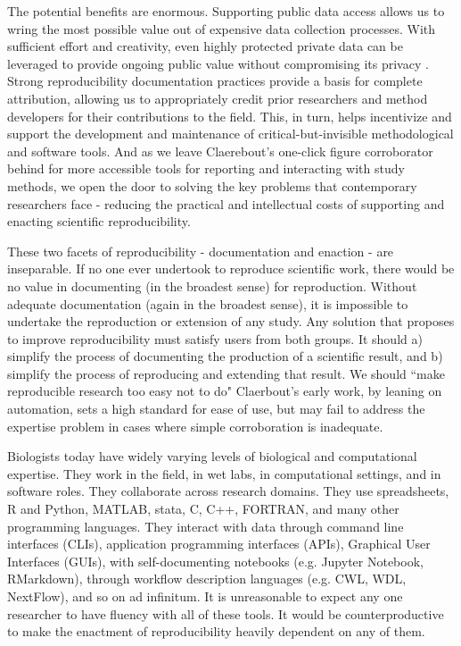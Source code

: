 The potential benefits are enormous. Supporting public data access allows us to
wring the most possible value out of expensive data collection processes. With
sufficient effort and creativity, even highly protected private data can be
leveraged to provide ongoing public value without compromising its privacy \parencite{schaffter_nlp_2022}.
Strong reproducibility documentation practices provide a basis for complete
attribution, allowing us to appropriately credit prior researchers and method
developers for their contributions to the field. This, in turn, helps
incentivize and support the development and maintenance of
critical-but-invisible methodological and software tools. And as we leave
Claerebout’s one-click figure corroborator behind for more accessible tools for
reporting and interacting with study methods, we open the door to solving the
key problems that contemporary researchers face - reducing the practical and
intellectual costs of supporting and enacting scientific reproducibility.

These two facets of reproducibility - documentation and enaction - are
inseparable. If no one ever undertook to reproduce scientific work, there would
be no value in documenting (in the broadest sense) for reproduction. Without
adequate documentation (again in the broadest sense), it is impossible to
undertake the reproduction or extension of any study. Any solution that proposes
to improve reproducibility must satisfy users from both groups. It should a)
simplify the process of documenting the production of a scientific result, and
b) simplify the process of reproducing and extending that result. We should
“make reproducible research too easy not to do" \parencite[19]{whitaker_turing_2019}
Claerbout’s early work, by leaning on automation, sets a high standard for ease
of use, but may fail to address the expertise problem in cases where simple
corroboration is inadequate.

Biologists today have widely varying levels of biological and computational
expertise. They work in the field, in wet labs, in computational settings, and
in software roles. They collaborate across research domains. They use
spreadsheets, R and Python, MATLAB, stata, C, C++, FORTRAN, and many other
programming languages. They interact with data through command line interfaces
(CLIs), application programming interfaces (APIs), Graphical User Interfaces
(GUIs), with self-documenting notebooks (e.g. Jupyter Notebook, RMarkdown),
through workflow description languages (e.g. CWL, WDL, NextFlow), and so on ad
infinitum. It is unreasonable to expect any one researcher to have fluency with
all of these tools. It would be counterproductive to make the enactment of
reproducibility heavily dependent on any of them.


